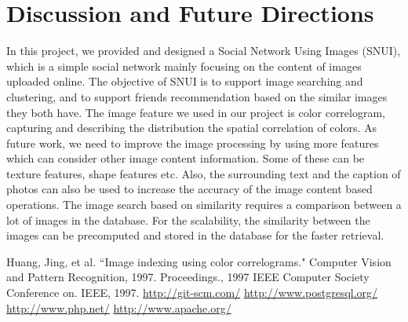 \documentclass[10pt,twocolumn,letterpaper]{article}
\begin{document}
\section{Discussion and Future Directions}
In this project, we provided and designed a Social Network Using Images (SNUI), which is a simple social network mainly focusing on the content of images uploaded online. The objective of SNUI is to support image searching and clustering, and to support friends recommendation based on the similar images they both have. The image feature we used in our project is color correlogram, capturing and describing the distribution the spatial correlation of colors. As future work, we need to improve the image processing by using more features which can consider other image content information. Some of these can be texture features, shape features etc. Also, the surrounding text and the caption of photos can also be used to increase the accuracy of the image content based operations. The image search based on similarity requires a comparison between a lot of images in the database. For the scalability, the similarity between the images can be precomputed and stored in the database for the faster retrieval.

\begin{thebibliography}{50}
  Huang, Jing, et al. ``Image indexing using color correlograms." Computer Vision and Pattern Recognition, 1997. Proceedings., 1997 IEEE Computer Society Conference on. IEEE, 1997.
  \url{http://git-scm.com/}
  \url{http://www.postgresql.org/}
  \url{http://www.php.net/}
  \url{http://www.apache.org/}
\end{thebibliography}
\end{document}
